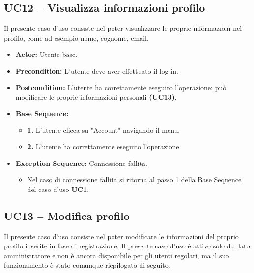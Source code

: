 \subsection{UC12 -- Visualizza informazioni profilo}
Il presente caso d'uso consiste nel poter visualizzare le 
proprie informazioni nel profilo, come ad esempio nome, cognome, email. 
\begin{itemize}
    \item \textbf{Actor:} Utente base.
    \item \textbf{Precondition:} L'utente deve aver effettuato il log in.
    \item \textbf{Postcondition:} L'utente ha correttamente eseguito l'operazione: può modificare le proprie informazioni personali \textbf{(UC13)}.
    \item \textbf{Base Sequence:}
    \begin{itemize}
        \item \textbf{1.} L'utente clicca su "Account" navigando il menu.
        \item \textbf{2.} L'utente ha correttamente eseguito l'operazione.
    \end{itemize}
    
    \item \textbf{Exception Sequence:} Connessione fallita.
    \begin{itemize}
        \item Nel caso di connessione fallita si ritorna al passo 1 della Base Sequence del caso d'uso \textbf{UC1}.
    \end{itemize}
\end{itemize}
\vspace{1cm}

\subsection{UC13 -- Modifica profilo}
Il presente caso d'uso consiste nel poter modificare le informazioni
del proprio profilo inserite in fase di registrazione. 
Il presente caso d'uso è attivo solo dal lato amministratore e non è
ancora disponibile per gli utenti regolari, ma il suo funzionamento
è stato comunque riepilogato di seguito.

